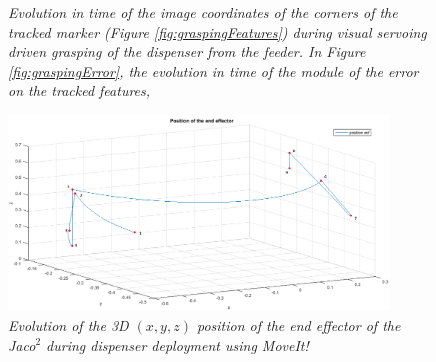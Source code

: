 \begin{figure}
	\centering
	\caption{\textit{Evolution in time of the image coordinates of the corners of the tracked marker (Figure \ref{fig:graspingFeatures}) during visual servoing driven grasping of the dispenser from the feeder. In Figure \ref{fig:graspingError}, the evolution in time of the module of the error on the tracked features,}}
	\label{fig:graspingLowResult}
\end{figure}



\begin{figure}
	\centering
	\includegraphics[width=0.9\textwidth]{Images/experimental_data/depl_moveit_endeffector.png}
	\caption{\textit{Evolution of the 3D $(x,y,z)$ position of the end effector of the Jaco$^2$ during dispenser deployment using MoveIt!}}
	\label{fig:deplMoveitEndEffect}
\end{figure}

